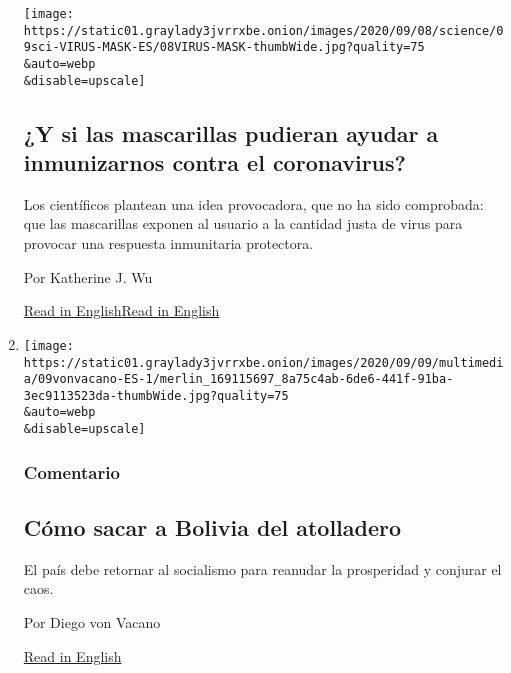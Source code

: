 \begin{enumerate}
  \texttt{[image: https://static01.graylady3jvrrxbe.onion/images/2020/09/08/science/09sci-VIRUS-MASK-ES/08VIRUS-MASK-thumbWide.jpg?quality=75\\\&auto=webp\\\&disable=upscale]}

  \hypertarget{y-si-las-mascarillas-pudieran-ayudar-a-inmunizarnos-contra-el-coronavirus}{%
  \subsection{¿Y si las mascarillas pudieran ayudar a inmunizarnos
  contra el
  coronavirus?}\label{y-si-las-mascarillas-pudieran-ayudar-a-inmunizarnos-contra-el-coronavirus}}

  Los científicos plantean una idea provocadora, que no ha sido
  comprobada: que las mascarillas exponen al usuario a la cantidad justa
  de virus para provocar una respuesta inmunitaria protectora.

  Por Katherine J. Wu

  \href{https://www.nytimes3xbfgragh.onion/2020/09/08/health/covid-masks-immunity.html}{Read
  in
  English}\href{https://www.nytimes3xbfgragh.onion/2020/09/08/health/covid-masks-immunity.html}{Read
  in English}
\item
  \href{/es/2020/09/09/espanol/opinion/bolivia-arce-mas-socialismo.html}{}

  \texttt{[image: https://static01.graylady3jvrrxbe.onion/images/2020/09/09/multimedia/09vonvacano-ES-1/merlin\_169115697\_8a75c4ab-6de6-441f-91ba-3ec9113523da-thumbWide.jpg?quality=75\\\&auto=webp\\\&disable=upscale]}

  \hypertarget{comentario-1}{%
  \subsubsection{Comentario}\label{comentario-1}}

  \hypertarget{cuxf3mo-sacar-a-bolivia-del-atolladero}{%
  \subsection{Cómo sacar a Bolivia del
  atolladero}\label{cuxf3mo-sacar-a-bolivia-del-atolladero}}

  El país debe retornar al socialismo para reanudar la prosperidad y
  conjurar el caos.

  Por Diego von Vacano

  \href{https://www.nytimes3xbfgragh.onion/es/2020/09/09/opinion/contributors/bolivia-socialism-arce-elections-morales.html?action=click\&module=Opinion\&pgtype=Homepage}{Read
  in English}
\end{enumerate}

